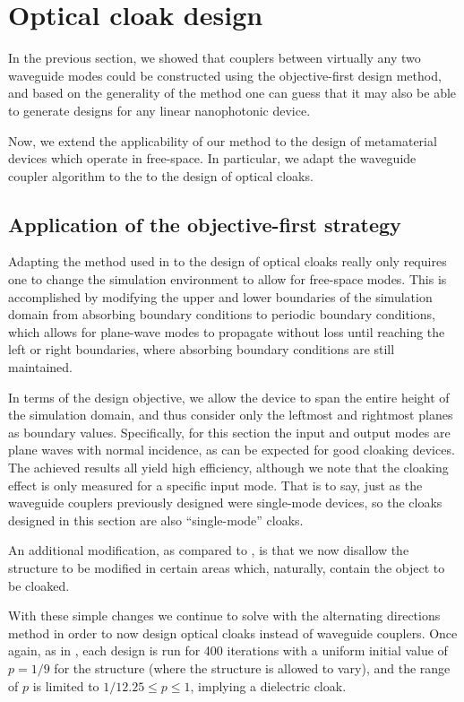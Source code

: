 \section{Optical cloak design}
In the previous section,
    we showed that couplers between virtually any two waveguide modes
    could be constructed using the objective-first design method,
    and based on the generality of the method
    one can guess that it may also be
    able to generate designs for any linear nanophotonic device.

Now, we extend the applicability of our method
    to the design of metamaterial devices which operate in free-space.
In particular,
    we adapt the waveguide coupler algorithm to the 
    to the design of optical cloaks.

\subsection{Application of the objective-first strategy}
Adapting the method used in  to the design of optical cloaks
    really only requires one to change the simulation environment
    to allow for free-space modes.
This is accomplished by modifying the upper and lower boundaries
    of the simulation domain from absorbing boundary conditions
    to periodic boundary conditions,
    which allows for plane-wave modes to propagate without loss
    until reaching the left or right boundaries,
    where absorbing boundary conditions are still maintained.

In terms of the design objective, 
    we allow the device to span the entire height of the simulation domain,
    and thus consider only the leftmost and rightmost planes as boundary values.
Specifically, for this section the input and output modes are plane waves
    with normal incidence, 
    as can be expected for good cloaking devices.
The achieved results all yield high efficiency,
    although we note that the cloaking effect is only measured
    for a specific input mode.
That is to say, just as the waveguide couplers previously designed
    were single-mode devices,
    so the cloaks designed in this section are also ``single-mode'' cloaks.

An additional modification, as compared to , is that
    we now disallow the structure to be modified in certain areas
    which, naturally, contain the object to be cloaked.

With these simple changes we continue to solve 
    with the alternating directions method
    in order to now design optical cloaks
    instead of waveguide couplers.
Once again, as in , each design is run for 400 iterations
    with a uniform initial value of $p = 1/9$ for the structure
    (where the structure is allowed to vary),
    and the range of $p$ is limited to $1/12.25 \le p \le 1$,
    implying a dielectric cloak.


